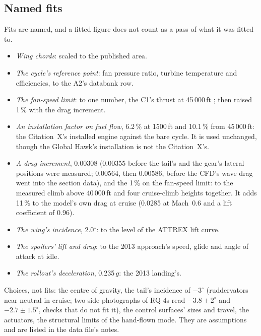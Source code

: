 \documentclass[10pt,a4paper,twocolumn]{article}
\begin{document}
\subsection{Named fits}\label{sec:fits}
Fits are named, and a fitted figure does not count as a pass of what it was fitted to.
\begin{itemize}
\item \emph{Wing chords}: scaled to the published area.
\item \emph{The cycle's reference point}: fan pressure ratio, turbine temperature and efficiencies, to the A2's databank row.
\item \emph{The fan-speed limit}: to one number, the C1's thrust at 45\,000\,ft \cite{ghazi}; then raised 1\,\% with the drag increment.
\item \emph{An installation factor on fuel flow}, 6.2\,\% at 1500\,ft and 10.1\,\% from 45\,000\,ft: the Citation~X's installed engine against the
bare cycle. It is used unchanged, though the Global Hawk's installation is not the Citation~X's.
\item \emph{A drag increment}, 0.00308 (0.00355 before the tail's and the gear's lateral positions were measured; 0.00564, then 0.00586, before the CFD's wave drag went into the section data), and the 1\,\% on the fan-speed limit: to the measured climb above 40\,000\,ft and four cruise-climb heights
together. It adds 11\,\% to the model's own drag at cruise (0.0285 at Mach~0.6 and a lift coefficient of 0.96).
\item \emph{The wing's incidence}, 2.0$^\circ$: to the level of the ATTREX lift curve.
\item \emph{The spoilers' lift and drag}: to the 2013 approach's speed, glide and angle of attack at idle.
\item \emph{The rollout's deceleration}, 0.235\,$g$: the 2013 landing's.
\end{itemize}
Choices, not fits: the centre of gravity, the tail's incidence of $-3^\circ$ (ruddervators near neutral in cruise; two side photographs of RQ-4s read $-3.8\pm2^\circ$ and $-2.7\pm1.5^\circ$, checks that do not fit it), the control surfaces' sizes and
travel, the actuators, the structural limits of the hand-flown mode. They are assumptions and are listed in the data file's notes.
\end{document}
